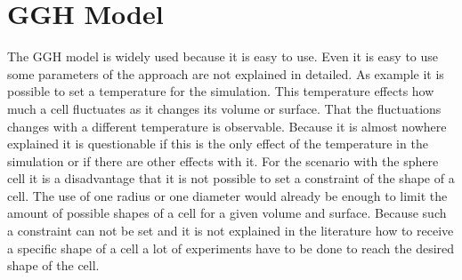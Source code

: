\section{GGH Model}
The \ac{GGH} model is widely used because it is easy to use. Even it is easy to use some parameters of the approach are not explained in detailed. As example it is possible to set a temperature for the simulation. This temperature effects how much a cell fluctuates as it changes its volume or surface. That the fluctuations changes with a different temperature is observable. Because it is almost nowhere explained it is questionable if this is the only effect of the temperature in the simulation or if there are other effects with it. \newline
For the scenario with the sphere cell it is a disadvantage that it is not possible to set a constraint of the shape of a cell. The use of one radius or one diameter would already be enough to limit the amount of possible shapes of a cell for a given volume and surface. Because such a constraint can not be set and it is not explained in the literature how to receive a specific shape of a cell a lot of experiments have to be done to reach the desired shape of the cell.